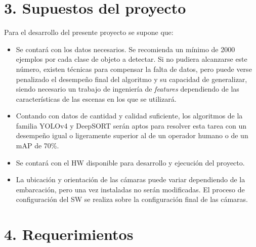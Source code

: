 \documentclass[11pt]{charter}
\begin{document}
\section{3. Supuestos del proyecto}
\label{sec:supuestos}

Para el desarrollo del presente proyecto se supone que:

\begin{itemize}
\item Se contará con los datos necesarios. Se recomienda un mínimo de 2000 ejemplos por cada clase de objeto a detectar. Si no pudiera alcanzarse este número, existen técnicas para compensar la falta de datos, pero puede verse penalizado el desempeño final del algoritmo y su capacidad de generalizar, siendo necesario un trabajo de ingeniería de {\em features } dependiendo de las características de las escenas en los que se utilizará.
\item Contando con datos de cantidad y calidad suficiente, los algoritmos de la familia YOLOv4 y DeepSORT serán aptos para resolver esta tarea con un desempeño igual o ligeramente superior al de un operador humano o de un mAP de 70\%.
\item Se contará con el HW disponible para desarrollo y ejecución del proyecto.
\item La ubicación y orientación de las cámaras puede variar dependiendo de la embarcación, pero una vez instaladas no serán modificadas. El proceso de configuración del SW se realiza sobre la configuración final de las cámaras.
\end{itemize}

\section{4. Requerimientos}
\label{sec:requerimientos}
\end{document}
